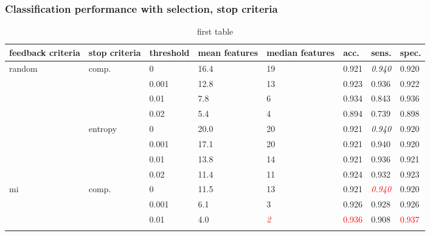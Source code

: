 \subsubsection{Classification performance with selection, stop criteria}
\begin{table}[h]
	\centering
	\caption{first table}
	\label{my-label}
	\begin{tabularx}{\textwidth}{|X|X|X|X|X|X|X|X|}
		\hline
		feedback criteria        & stop criteria            & threshold & mean features & median features  & acc.           & sens.                & spec.          \\ \hline
		\multirow{8}{*}{random}  & \multirow{4}{*}{comp.}   & 0         & 16.4          & 19               & 0.921          & \textit{0.940}       & 0.920          \\ \cline{3-8} 
		&                          & 0.001     & 12.8          & 13               & 0.923          & 0.936                & 0.922          \\ \cline{3-8} 
		&                          & 0.01      & 7.8           & 6                & 0.934          & 0.843                & 0.936          \\ \cline{3-8} 
		&                          & 0.02      & 5.4           & 4                & 0.894          & 0.739                & 0.898          \\ \cline{2-8} 
		& \multirow{4}{*}{entropy} & 0         & 20.0          & 20               & 0.921          & \textit{0.940}       & 0.920          \\ \cline{3-8} 
		&                          & 0.001     & 17.1          & 20               & 0.921          & 0.940                & 0.920          \\ \cline{3-8} 
		&                          & 0.01      & 13.8          & 14               & 0.921          & 0.936                & 0.921          \\ \cline{3-8} 
		&                          & 0.02      & 11.4          & 11               & 0.924          & 0.932                & 0.923          \\ \hline
		\multirow{8}{*}{mi}      & \multirow{4}{*}{comp.}   & 0         & 11.5          & 13               & 0.921          & \textcolor{red}{\textit{0.940}} & 0.920          \\ \cline{3-8} 
		&                          & 0.001     & 6.1           & 3                & 0.926          & 0.928                & 0.926          \\ \cline{3-8} 
		&                          & 0.01      & 4.0           & \textcolor{red}{\textit{2}} & \textcolor{red}{0.936}    & 0.908                & \textcolor{red}{0.937}    \\ \cline{3-8} 

\end{tabularx}
\end{table}
